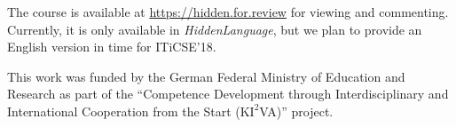\documentclass[sigconf]{acmart}
\begin{document}
The course is available at \url{https://hidden.for.review} for viewing and commenting. Currently, it is
only available in \emph{HiddenLanguage}, but we plan to provide an English version in time for ITiCSE'18.


\begin{acks}
This work was funded by the German Federal Ministry of Education and Research as part of the 
``Competence Development through Interdisciplinary and International Cooperation from the Start
(K$\mathrm{I^2}$VA)'' project.
\end{acks}


%
\end{document}
